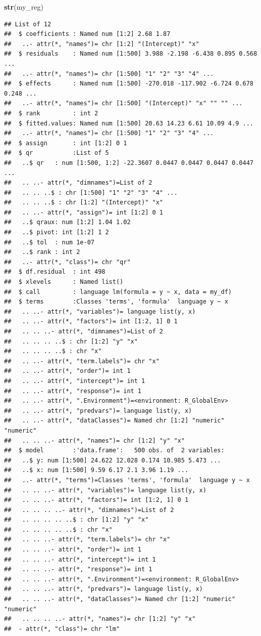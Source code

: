 \documentclass[]{book}
\newenvironment{Shaded}{\begin{snugshade}}{\end{snugshade}}
\newcommand{\KeywordTok}[1]{\textcolor[rgb]{0.13,0.29,0.53}{\textbf{#1}}}
\newcommand{\NormalTok}[1]{#1}
\theoremstyle{definition}
\theoremstyle{definition}
\theoremstyle{definition}
\theoremstyle{remark}
\begin{document}
\begin{Shaded}
\begin{Highlighting}[]
\KeywordTok{str}\NormalTok{(my_reg)}
\end{Highlighting}
\end{Shaded}

\begin{verbatim}
## List of 12
##  $ coefficients : Named num [1:2] 2.68 1.87
##   ..- attr(*, "names")= chr [1:2] "(Intercept)" "x"
##  $ residuals    : Named num [1:500] 3.988 -2.198 -6.438 0.895 0.568 ...
##   ..- attr(*, "names")= chr [1:500] "1" "2" "3" "4" ...
##  $ effects      : Named num [1:500] -270.018 -117.902 -6.724 0.678 0.248 ...
##   ..- attr(*, "names")= chr [1:500] "(Intercept)" "x" "" "" ...
##  $ rank         : int 2
##  $ fitted.values: Named num [1:500] 20.63 14.23 6.61 10.09 4.9 ...
##   ..- attr(*, "names")= chr [1:500] "1" "2" "3" "4" ...
##  $ assign       : int [1:2] 0 1
##  $ qr           :List of 5
##   ..$ qr   : num [1:500, 1:2] -22.3607 0.0447 0.0447 0.0447 0.0447 ...
##   .. ..- attr(*, "dimnames")=List of 2
##   .. .. ..$ : chr [1:500] "1" "2" "3" "4" ...
##   .. .. ..$ : chr [1:2] "(Intercept)" "x"
##   .. ..- attr(*, "assign")= int [1:2] 0 1
##   ..$ qraux: num [1:2] 1.04 1.02
##   ..$ pivot: int [1:2] 1 2
##   ..$ tol  : num 1e-07
##   ..$ rank : int 2
##   ..- attr(*, "class")= chr "qr"
##  $ df.residual  : int 498
##  $ xlevels      : Named list()
##  $ call         : language lm(formula = y ~ x, data = my_df)
##  $ terms        :Classes 'terms', 'formula'  language y ~ x
##   .. ..- attr(*, "variables")= language list(y, x)
##   .. ..- attr(*, "factors")= int [1:2, 1] 0 1
##   .. .. ..- attr(*, "dimnames")=List of 2
##   .. .. .. ..$ : chr [1:2] "y" "x"
##   .. .. .. ..$ : chr "x"
##   .. ..- attr(*, "term.labels")= chr "x"
##   .. ..- attr(*, "order")= int 1
##   .. ..- attr(*, "intercept")= int 1
##   .. ..- attr(*, "response")= int 1
##   .. ..- attr(*, ".Environment")=<environment: R_GlobalEnv> 
##   .. ..- attr(*, "predvars")= language list(y, x)
##   .. ..- attr(*, "dataClasses")= Named chr [1:2] "numeric" "numeric"
##   .. .. ..- attr(*, "names")= chr [1:2] "y" "x"
##  $ model        :'data.frame':   500 obs. of  2 variables:
##   ..$ y: num [1:500] 24.622 12.028 0.174 10.985 5.473 ...
##   ..$ x: num [1:500] 9.59 6.17 2.1 3.96 1.19 ...
##   ..- attr(*, "terms")=Classes 'terms', 'formula'  language y ~ x
##   .. .. ..- attr(*, "variables")= language list(y, x)
##   .. .. ..- attr(*, "factors")= int [1:2, 1] 0 1
##   .. .. .. ..- attr(*, "dimnames")=List of 2
##   .. .. .. .. ..$ : chr [1:2] "y" "x"
##   .. .. .. .. ..$ : chr "x"
##   .. .. ..- attr(*, "term.labels")= chr "x"
##   .. .. ..- attr(*, "order")= int 1
##   .. .. ..- attr(*, "intercept")= int 1
##   .. .. ..- attr(*, "response")= int 1
##   .. .. ..- attr(*, ".Environment")=<environment: R_GlobalEnv> 
##   .. .. ..- attr(*, "predvars")= language list(y, x)
##   .. .. ..- attr(*, "dataClasses")= Named chr [1:2] "numeric" "numeric"
##   .. .. .. ..- attr(*, "names")= chr [1:2] "y" "x"
##  - attr(*, "class")= chr "lm"
\end{verbatim}
\end{document}
